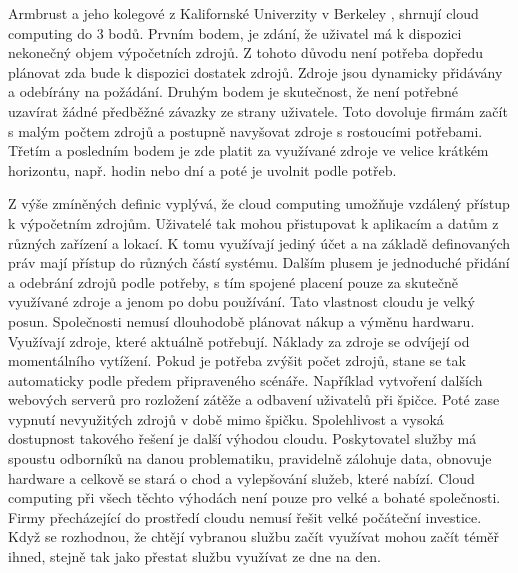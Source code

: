     Armbrust a jeho kolegové z Kalifornské Univerzity v Berkeley \cite{Ambrust2009}, shrnují cloud computing do 3 bodů. Prvním bodem, je zdání, že uživatel má k dispozici nekonečný objem výpočetních zdrojů. Z tohoto důvodu není potřeba dopředu plánovat zda bude k dispozici dostatek zdrojů. Zdroje jsou dynamicky přidávány a odebírány na požádání. Druhým bodem je skutečnost, že není potřebné uzavírat žádné předběžné závazky ze strany uživatele. Toto dovoluje firmám začít s malým počtem zdrojů a postupně navyšovat zdroje s rostoucími potřebami. Třetím a posledním bodem je zde platit \linebreak za využívané zdroje ve velice krátkém horizontu, např. hodin nebo dní a poté je uvolnit podle potřeb. \par

    Z výše zmíněných definic vyplývá, že cloud computing umožňuje vzdálený přístup k výpočetním zdrojům. Uživatelé tak mohou přistupovat k aplikacím a datům  \linebreak z různých zařízení a lokací. K tomu využívají jediný účet a na základě definovaných práv mají přístup do různých částí systému. Dalším plusem je jednoduché přidání a odebrání zdrojů podle potřeby, s tím spojené placení pouze za skutečně využívané zdroje a jenom po dobu používání. Tato vlastnost cloudu je velký posun. Společnosti nemusí dlouhodobě plánovat nákup a výměnu hardwaru. Využívají zdroje, které \linebreak aktuálně potřebují. Náklady za zdroje se odvíjejí od momentálního vytížení. Pokud je potřeba zvýšit počet zdrojů, stane se tak automaticky podle předem připraveného scénáře. Například vytvoření dalších webových serverů pro rozložení zátěže a \linebreak odbavení uživatelů při špičce. Poté zase vypnutí nevyužitých zdrojů v době mimo špičku.  \linebreak Spolehlivost a vysoká dostupnost takového řešení je další výhodou cloudu. Poskytovatel služby má spoustu odborníků na danou problematiku, pravidelně zálohuje data, obnovuje hardware a celkově se stará o chod a vylepšování služeb, které nabízí. Cloud computing při všech těchto výhodách není pouze pro velké a bohaté společnosti. Firmy přecházející do prostředí cloudu nemusí řešit velké počáteční investice. Když se rozhodnou, že chtějí vybranou službu začít využívat mohou začít téměř ihned, stejně tak jako přestat službu využívat ze dne na den.\par
